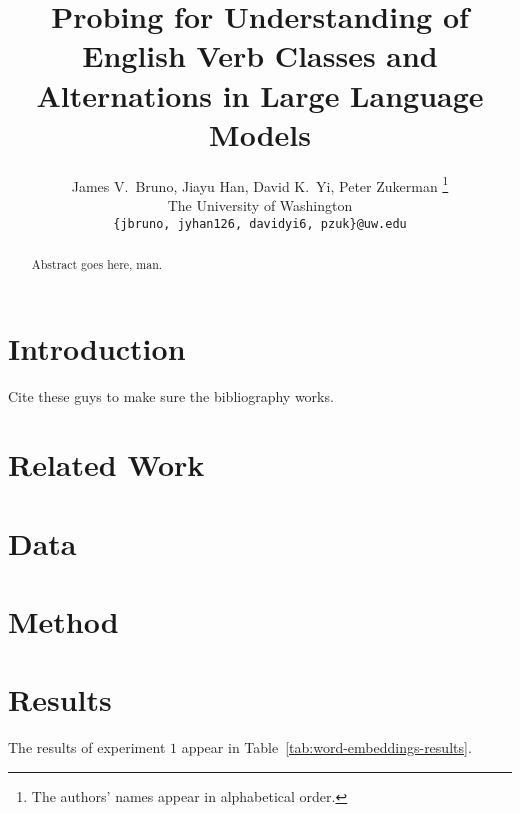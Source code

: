 \documentclass[11pt]{article}
\title{Probing for Understanding of English Verb Classes and Alternations in Large Language Models}
\author{James V.~Bruno, Jiayu Han, David K.~Yi, Peter Zukerman \thanks{ The authors' names appear in alphabetical order.}\\
The University of Washington\\
  \texttt{\{jbruno, jyhan126, davidyi6, pzuk\}@uw.edu}}
\begin{document}
\maketitle
\begin{abstract}
Abstract goes here, man.
\end{abstract}

\section{Introduction}

Cite these guys to make sure the bibliography works.  \cite{kann-etal-2019-verb}

\section{Related Work}

\section{Data}
\section{Method}
\section{Results}

The results of experiment $1$ appear in Table~\ref{tab:word-embeddings-results}.
\end{document}
